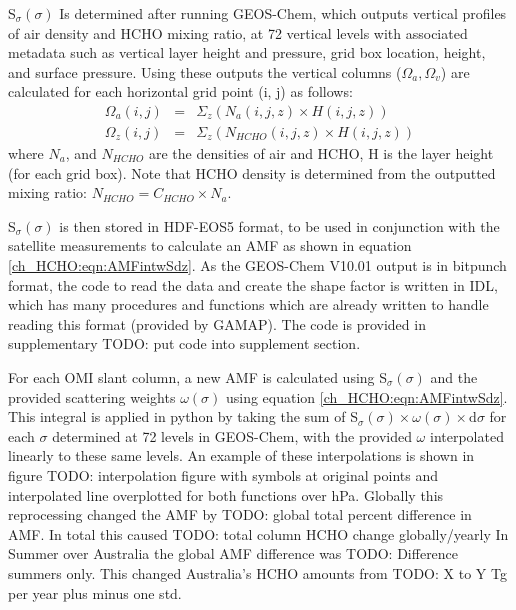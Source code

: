    S$_\sigma(\sigma)$ Is determined after running GEOS-Chem, which outputs vertical profiles of air density and HCHO mixing ratio, at 72 vertical levels with associated metadata such as vertical layer height and pressure, grid box location, height, and surface pressure.
    Using these outputs the vertical columns ($\Omega_a, \Omega_v$) are calculated for each horizontal grid point (i, j) as follows:
    \begin{align*}
      \Omega_a(i,j) &=& \Sigma_z \left( N_a(i,j,z) \times H(i,j,z) \right)
      \\
      \Omega_z(i,j) &=& \Sigma_z \left( N_{HCHO}(i,j,z) \times H(i,j,z) \right)
    \end{align*}
    where $N_a$, and $N_{HCHO}$ are the densities of air and HCHO, H is the layer height (for each grid box).
    Note that HCHO density is determined from the outputted mixing ratio: $N_{HCHO} = C_{HCHO} \times N_a$.

    S$_\sigma(\sigma)$ is then stored in HDF-EOS5 format, to be used in conjunction with the satellite measurements to calculate an AMF as shown in equation \ref{ch_HCHO:eqn:AMFintwSdz}.
    As the GEOS-Chem V10.01 output is in bitpunch format, the code to read the data and create the shape factor is written in IDL, which has many procedures and functions which are already written to handle reading this format (provided by GAMAP).
    The code is provided in supplementary TODO: put code into supplement section.
    
    For each OMI slant column, a new AMF is calculated using S$_\sigma(\sigma)$ and the provided scattering weights $\omega(\sigma)$ using equation \ref{ch_HCHO:eqn:AMFintwSdz}.
    This integral is applied in python by taking the sum of S$_\sigma(\sigma) \times \omega(\sigma) \times \mathrm{d}\sigma$ for each $\sigma$ determined at 72 levels in GEOS-Chem, with the provided $\omega$ interpolated linearly to these same levels.
    An example of these interpolations is shown in figure TODO: interpolation figure with symbols at original points and interpolated line overplotted for both functions over hPa.
    Globally this reprocessing changed the AMF by TODO: global total percent difference in AMF. 
    In total this caused TODO: total column HCHO change globally/yearly
    In Summer over Australia the global AMF difference was TODO: Difference summers only.
    This changed Australia's HCHO amounts from TODO: X to Y Tg per year plus minus one std.
    
    
    

